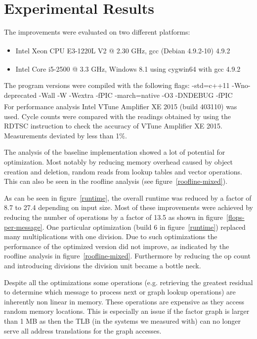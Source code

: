 \section{Experimental Results}\label{sec:results}

 The improvements were evaluated on two different platforms:
\begin{itemize}
\item Intel\textsuperscript{\textregistered} Xeon CPU E3-1220L V2 @ 2.30 GHz, gcc (Debian 4.9.2-10) 4.9.2
\item Intel\textsuperscript{\textregistered} Core i5-2500 @ 3.3 GHz, Windows 8.1 using cygwin64 with gcc 4.9.2
\end{itemize}

The program versions were compiled with the following flags: 
-std=c++11 -Wno-deprecated -Wall -W -Wextra -fPIC -march=native -O3 -DNDEBUG -fPIC
\\
For performance analysis Intel\textsuperscript{\textregistered} VTune Amplifier XE 2015 (build 403110) was used. Cycle counts were compared with the readings obtained by using the RDTSC instruction to check the accuracy of VTune Amplifier XE 2015. Measurements deviated by less than 1\%.

The analysis of the baseline implementation showed a lot of potential for optimization. Most notably by reducing memory overhead caused by object creation and deletion, random reads from lookup tables and vector operations. This can also be seen in the roofline analysis \cite{Ofenbeck:14} (see figure~\ref{roofline-mixed}).

As can be seen in figure~\ref{runtime}, the overall runtime was reduced by a factor of 8.7 to 27.4 depending on input size. Most of these improvements were achieved by reducing the number of operations by a factor of 13.5 as shown in figure~\ref{flops-per-message}. One particular optimization (build 6 in figure~\ref{runtime}) replaced many multiplications with one division. Due to such optimizations the performance of the optimized version did not improve, as indicated by the roofline analysis in figure~\ref{roofline-mixed}. Furthermore by reducing the op count and introducing divisions the division unit became a bottle neck.

Despite all the optimizations some operations (e.g. retrieving the greatest residual to determine which message to process next or graph lookup operations) are inherently non linear in memory. These operations are expensive as they access random memory locations. This is especially an issue if the factor graph is larger than 1 MB as then the TLB (in the systems we measured with) can no longer serve all address translations for the graph accesses.


